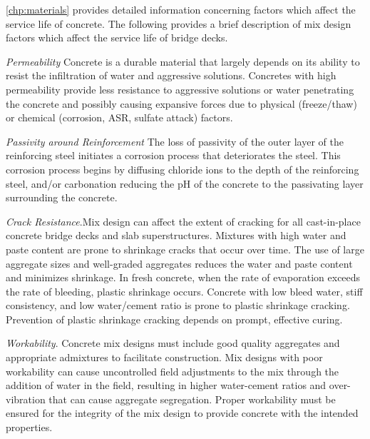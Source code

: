 \cref{chp:materials} provides detailed information concerning factors which affect the service life of concrete. The
following provides a brief description of mix design factors which affect the service life of bridge decks.

\emph{Permeability} Concrete is a durable material that largely depends on its ability to resist the infiltration of water and
aggressive solutions. Concretes with high permeability provide less resistance to aggressive solutions or water
penetrating the concrete and possibly causing expansive forces due to physical (freeze/thaw) or chemical (corrosion,
ASR, sulfate attack) factors.

\emph{Passivity around Reinforcement} The loss of passivity of the outer layer of the reinforcing steel initiates a corrosion
process that deteriorates the steel. This corrosion process begins by diffusing chloride ions to the depth of the
reinforcing steel, and/or carbonation reducing the pH of the concrete to the passivating layer surrounding the
concrete.

\emph{Crack Resistance}.Mix design can affect the extent of cracking for all cast-in-place concrete bridge decks and slab
superstructures. Mixtures with high water and paste content are prone to shrinkage cracks that occur over time. The
use of large aggregate sizes and well-graded aggregates reduces the water and paste content and minimizes
shrinkage. In fresh concrete, when the rate of evaporation exceeds the rate of bleeding, plastic shrinkage occurs. Concrete with low bleed water, stiff consistency, and low water/cement ratio is prone to plastic shrinkage cracking.
Prevention of plastic shrinkage cracking depends on prompt, effective curing.

\emph{Workability}. Concrete mix designs must include good quality aggregates and appropriate admixtures to facilitate
construction. Mix designs with poor workability can cause uncontrolled field adjustments to the mix through the
addition of water in the field, resulting in higher water-cement ratios and over-vibration that can cause aggregate
segregation. Proper workability must be ensured for the integrity of the mix design to provide concrete with the
intended properties.

